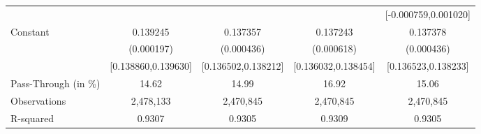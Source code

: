 {\begin{tabular}{l*{4}{c}}
                    &                     &                     &                     &[-0.000759,0.001020]         \\
Constant            &    0.139245\sym{***}&    0.137357\sym{***}&    0.137243\sym{***}&    0.137378\sym{***}\\
                    &  (0.000197)         &  (0.000436)         &  (0.000618)         &  (0.000436)         \\
                    &[0.138860,0.139630]         &[0.136502,0.138212]         &[0.136032,0.138454]         &[0.136523,0.138233]         \\
\midrule
Pass-Through (in \%)&       14.62         &       14.99         &       16.92         &       15.06         \\
Observations        &   2,478,133         &   2,470,845         &   2,470,845         &   2,470,845         \\
R-squared           &      0.9307         &      0.9305         &      0.9309         &      0.9305         \\
\bottomrule
\end{tabular}
}
